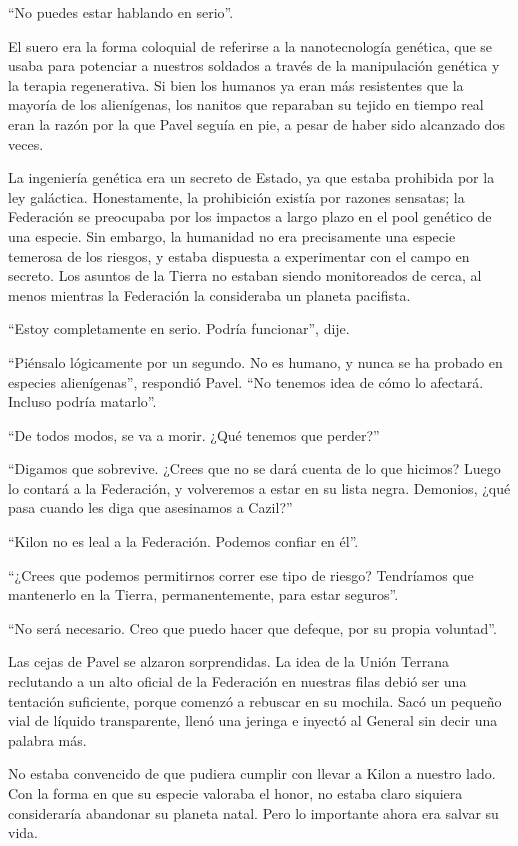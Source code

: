 \documentclass[spanish,12pt,a4paper,oneside,titlepage]{book}
\begin{document}
    ``No puedes estar hablando en serio''.

    El suero era la forma coloquial de referirse a la nanotecnología genética, que se usaba para potenciar a nuestros soldados a través de la manipulación genética y la terapia regenerativa. Si bien los humanos ya eran más resistentes que la mayoría de los alienígenas, los nanitos que reparaban su tejido en tiempo real eran la razón por la que Pavel seguía en pie, a pesar de haber sido alcanzado dos veces.

    La ingeniería genética era un secreto de Estado, ya que estaba prohibida por la ley galáctica. Honestamente, la prohibición existía por razones sensatas; la Federación se preocupaba por los impactos a largo plazo en el pool genético de una especie. Sin embargo, la humanidad no era precisamente una especie temerosa de los riesgos, y estaba dispuesta a experimentar con el campo en secreto. Los asuntos de la Tierra no estaban siendo monitoreados de cerca, al menos mientras la Federación la consideraba un planeta pacifista.

    ``Estoy completamente en serio. Podría funcionar'', dije.

    ``Piénsalo lógicamente por un segundo. No es humano, y nunca se ha probado en especies alienígenas'', respondió Pavel. ``No tenemos idea de cómo lo afectará. Incluso podría matarlo''.

    ``De todos modos, se va a morir. ¿Qué tenemos que perder?''

    ``Digamos que sobrevive. ¿Crees que no se dará cuenta de lo que hicimos? Luego lo contará a la Federación, y volveremos a estar en su lista negra. Demonios, ¿qué pasa cuando les diga que asesinamos a Cazil?''

    ``Kilon no es leal a la Federación. Podemos confiar en él''.

    ``¿Crees que podemos permitirnos correr ese tipo de riesgo? Tendríamos que mantenerlo en la Tierra, permanentemente, para estar seguros''.

    ``No será necesario. Creo que puedo hacer que defeque, por su propia voluntad''.

    Las cejas de Pavel se alzaron sorprendidas. La idea de la Unión Terrana reclutando a un alto oficial de la Federación en nuestras filas debió ser una tentación suficiente, porque comenzó a rebuscar en su mochila. Sacó un pequeño vial de líquido transparente, llenó una jeringa e inyectó al General sin decir una palabra más.

    No estaba convencido de que pudiera cumplir con llevar a Kilon a nuestro lado. Con la forma en que su especie valoraba el honor, no estaba claro siquiera consideraría abandonar su planeta natal. Pero lo importante ahora era salvar su vida.
\end{document}
